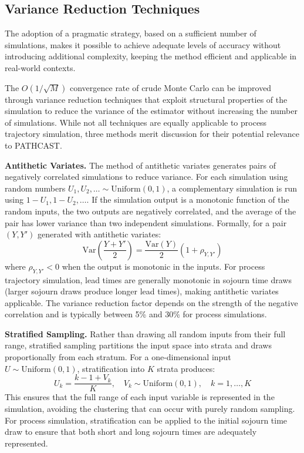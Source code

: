 \subsection{Variance Reduction Techniques}
\label{sec:mc-variance-reduction}
The adoption of a pragmatic strategy, based on a sufficient number of simulations, makes it possible to achieve adequate levels of accuracy without introducing additional complexity, keeping the method efficient and applicable in real-world contexts.

The $O(1/\sqrt{M})$ convergence rate of crude Monte Carlo can be
improved through variance reduction techniques that exploit structural
properties of the simulation to reduce the variance of the estimator
without increasing the number of simulations. While not all techniques
are equally applicable to process trajectory simulation, three methods
merit discussion for their potential relevance to PATHCAST.

\textbf{Antithetic Variates.} The method of antithetic variates generates
pairs of negatively correlated simulations to reduce variance. For each
simulation using random numbers $U_1, U_2, \ldots \sim
\text{Uniform}(0,1)$, a complementary simulation is run using $1-U_1,
1-U_2, \ldots$. If the simulation output is a monotonic function of the
random inputs, the two outputs are negatively correlated, and the average
of the pair has lower variance than two independent simulations. Formally,
for a pair $(Y, Y')$ generated with antithetic variates:
\begin{equation}
\label{eq:antithetic}
\text{Var}\left(\frac{Y + Y'}{2}\right) =
\frac{\text{Var}(Y)}{2}\left(1 + \rho_{Y,Y'}\right)
\end{equation}
where $\rho_{Y,Y'} < 0$ when the output is monotonic in the inputs.
For process trajectory simulation, lead times are generally monotonic
in sojourn time draws (larger sojourn draws produce longer lead times),
making antithetic variates applicable. The variance reduction factor
depends on the strength of the negative correlation and is typically
between 5\% and 30\% for process simulations.

\textbf{Stratified Sampling.} Rather than drawing all random inputs from
their full range, stratified sampling partitions the input space into
strata and draws proportionally from each stratum. For a one-dimensional
input $U \sim \text{Uniform}(0,1)$, stratification into $K$ strata
produces:
\begin{equation}
\label{eq:stratified}
U_k = \frac{k - 1 + V_k}{K}, \quad V_k \sim \text{Uniform}(0,1),
\quad k = 1, \ldots, K
\end{equation}
This ensures that the full range of each input variable is represented
in the simulation, avoiding the clustering that can occur with purely
random sampling. For process simulation, stratification can be applied
to the initial sojourn time draw to ensure that both short and long
sojourn times are adequately represented.

